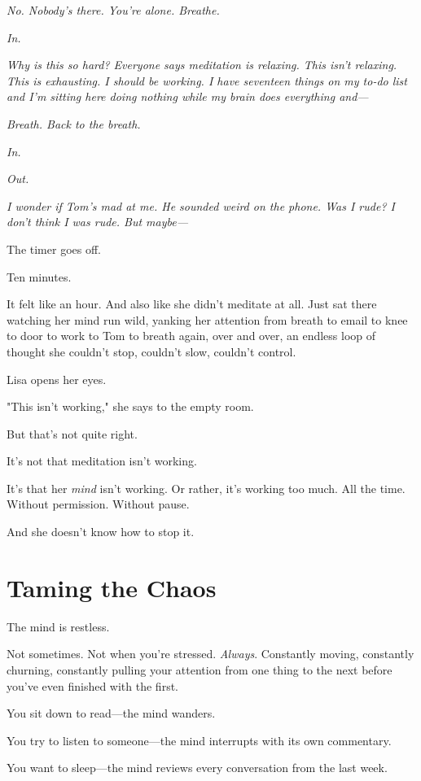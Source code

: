 \documentclass[11pt,twoside]{book}
\begin{document}
\emph{No. Nobody's there. You're alone. Breathe.}

\emph{In.}

\emph{Why is this so hard? Everyone says meditation is relaxing. This isn't relaxing. This is exhausting. I should be working. I have seventeen things on my to-do list and I'm sitting here doing nothing while my brain does everything and—}

\emph{Breath. Back to the breath.}

\emph{In.}

\emph{Out.}

\emph{I wonder if Tom's mad at me. He sounded weird on the phone. Was I rude? I don't think I was rude. But maybe—}

The timer goes off.

Ten minutes.

It felt like an hour. And also like she didn't meditate at all. Just sat there watching her mind run wild, yanking her attention from breath to email to knee to door to work to Tom to breath again, over and over, an endless loop of thought she couldn't stop, couldn't slow, couldn't control.

Lisa opens her eyes.

"This isn't working," she says to the empty room.

But that's not quite right.

It's not that meditation isn't working.

It's that her \emph{mind} isn't working. Or rather, it's working too much. All the time. Without permission. Without pause.

And she doesn't know how to stop it.

\section*{Taming the Chaos}

The mind is restless.

Not sometimes. Not when you're stressed. \emph{Always}. Constantly moving, constantly churning, constantly pulling your attention from one thing to the next before you've even finished with the first.

You sit down to read—the mind wanders.

You try to listen to someone—the mind interrupts with its own commentary.

You want to sleep—the mind reviews every conversation from the last week.
\end{document}
